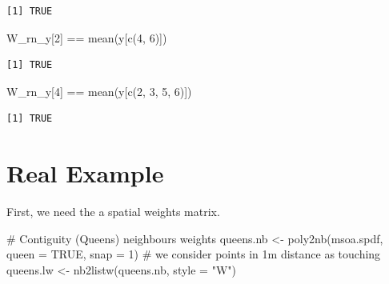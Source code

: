 \documentclass[
  letterpaper,
  DIV=11,
  numbers=noendperiod]{scrreprt}
\newenvironment{Shaded}{\begin{snugshade}}{\end{snugshade}}
\newcommand{\AttributeTok}[1]{\textcolor[rgb]{0.40,0.45,0.13}{#1}}
\newcommand{\CommentTok}[1]{\textcolor[rgb]{0.37,0.37,0.37}{#1}}
\newcommand{\ConstantTok}[1]{\textcolor[rgb]{0.56,0.35,0.01}{#1}}
\newcommand{\DecValTok}[1]{\textcolor[rgb]{0.68,0.00,0.00}{#1}}
\newcommand{\FunctionTok}[1]{\textcolor[rgb]{0.28,0.35,0.67}{#1}}
\newcommand{\NormalTok}[1]{\textcolor[rgb]{0.00,0.23,0.31}{#1}}
\newcommand{\OtherTok}[1]{\textcolor[rgb]{0.00,0.23,0.31}{#1}}
\newcommand{\SpecialCharTok}[1]{\textcolor[rgb]{0.37,0.37,0.37}{#1}}
\newcommand{\StringTok}[1]{\textcolor[rgb]{0.13,0.47,0.30}{#1}}
\begin{document}
\begin{verbatim}
[1] TRUE
\end{verbatim}

\begin{Shaded}
\begin{Highlighting}[]
\NormalTok{W\_rn\_y[}\DecValTok{2}\NormalTok{] }\SpecialCharTok{==} \FunctionTok{mean}\NormalTok{(y[}\FunctionTok{c}\NormalTok{(}\DecValTok{4}\NormalTok{, }\DecValTok{6}\NormalTok{)])}
\end{Highlighting}
\end{Shaded}

\begin{verbatim}
[1] TRUE
\end{verbatim}

\begin{Shaded}
\begin{Highlighting}[]
\NormalTok{W\_rn\_y[}\DecValTok{4}\NormalTok{] }\SpecialCharTok{==} \FunctionTok{mean}\NormalTok{(y[}\FunctionTok{c}\NormalTok{(}\DecValTok{2}\NormalTok{, }\DecValTok{3}\NormalTok{, }\DecValTok{5}\NormalTok{, }\DecValTok{6}\NormalTok{)])}
\end{Highlighting}
\end{Shaded}

\begin{verbatim}
[1] TRUE
\end{verbatim}

\hypertarget{real-example}{%
\section{Real Example}\label{real-example}}

First, we need the a spatial weights matrix.

\begin{Shaded}
\begin{Highlighting}[]
\CommentTok{\# Contiguity (Queens) neighbours weights}
\NormalTok{queens.nb }\OtherTok{\textless{}{-}} \FunctionTok{poly2nb}\NormalTok{(msoa.spdf, }
                     \AttributeTok{queen =} \ConstantTok{TRUE}\NormalTok{, }
                     \AttributeTok{snap =} \DecValTok{1}\NormalTok{) }\CommentTok{\# we consider points in 1m distance as \textquotesingle{}touching\textquotesingle{}}
\NormalTok{queens.lw }\OtherTok{\textless{}{-}} \FunctionTok{nb2listw}\NormalTok{(queens.nb,}
                      \AttributeTok{style =} \StringTok{"W"}\NormalTok{)}
\end{Highlighting}
\end{Shaded}
\end{document}
